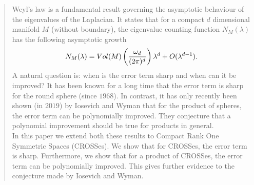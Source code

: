 \documentclass[11pt,lettersize,reqno,fullpage]{amsart}
\providecommand \hf{\hspace*{0.5cm}}
\begin{document}
\begin{abstract}
Weyl's law is a fundamental result governing the asymptotic behaviour of 
the eigenvalues of the Laplacian.   
It states that 
for a compact $d$ dimensional manifold $M$ 
(without boundary), the eigenvalue counting function $N_M(\lambda)$
has the following asymptotic growth   
\[ N_M(\lambda) = \textnormal{Vol}(M)\left(\frac{\omega_d}{(2\pi)^d}\right) \lambda^d + O(\lambda^{d-1}). \]   
\hf \hf A natural question is: when is the error term sharp and when can it be improved? 
It has been known for a long time that the error term is sharp for the round sphere (since $1968$). 
In contrast, it has only recently been shown (in $2019$)  
by Iosevich and Wyman that for the product of spheres, the error term can be polynomially improved. 
They conjecture that a polynomial improvement should be true for products in general. \\ 
\hf \hf In this paper we extend both these results 
to Compact Rank One Symmetric Spaces (CROSSes). We show that for CROSSes, the error term is sharp. 
Furthermore, we show that for a product of CROSSes, 
the error term can be polynomially improved. This gives further evidence to the conjecture made by  
Iosevich and Wyman. 
\end{abstract}

\tableofcontents
\end{document}
